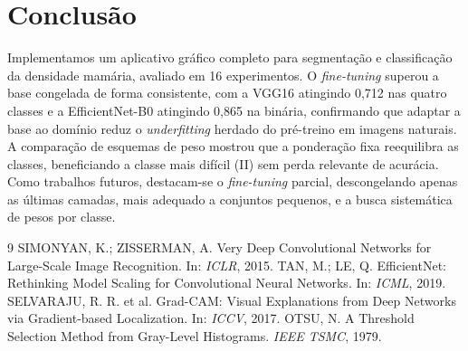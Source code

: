 \documentclass[twocolumn,a4paper,11pt]{article}
\begin{document}
\section{Conclusão}

Implementamos um aplicativo gráfico completo para segmentação e classificação da
densidade mamária, avaliado em 16 experimentos. O \emph{fine\nobreakdash-tuning} superou a
base congelada de forma consistente, com a VGG16 atingindo 0,712 nas quatro classes
e a EfficientNet\nobreakdash-B0 atingindo 0,865 na binária, confirmando que adaptar a base ao
domínio reduz o \emph{underfitting} herdado do pré\nobreakdash-treino em imagens naturais. A
comparação de esquemas de peso mostrou que a ponderação fixa reequilibra as
classes, beneficiando a classe mais difícil (II) sem perda relevante de acurácia.
Como trabalhos futuros, destacam\nobreakdash-se o \emph{fine\nobreakdash-tuning} parcial, descongelando
apenas as últimas camadas, mais adequado a conjuntos pequenos, e a busca
sistemática de pesos por classe.

\begin{thebibliography}{9}
\small
{} SIMONYAN, K.; ZISSERMAN, A. Very Deep Convolutional Networks
for Large\nobreakdash-Scale Image Recognition. In: \textit{ICLR}, 2015.
 TAN, M.; LE, Q. EfficientNet: Rethinking Model Scaling for
Convolutional Neural Networks. In: \textit{ICML}, 2019.
 SELVARAJU, R. R. et al. Grad\nobreakdash-CAM: Visual Explanations from
Deep Networks via Gradient\nobreakdash-based Localization. In: \textit{ICCV}, 2017.
 OTSU, N. A Threshold Selection Method from Gray\nobreakdash-Level
Histograms. \textit{IEEE TSMC}, 1979.
\end{thebibliography}
\end{document}
